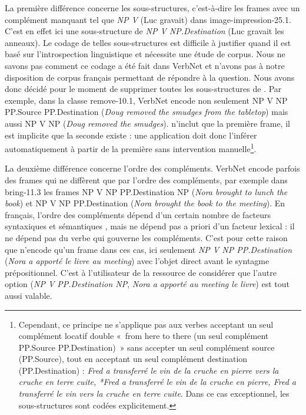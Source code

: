La première différence concerne les sous-structures, c'est-à-dire les frames
avec un complément manquant tel que \emph{NP V} (Luc gravait) dans
{\color{blue}image-impression-25.1}. C'est en effet ici une sous-structure de
\emph{NP V NP.Destination} (Luc gravait les anneaux). Le codage de telles
sous-structures est difficile à justifier quand il est basé sur l'introspection
linguistique et nécessite une étude de corpus. Nous ne savons pas comment ce
codage a été fait dans VerbNet et n'avons pas à notre disposition de corpus
français permettant de répondre à la question. Nous avons donc décidé pour le
moment de supprimer toutes les sous-structures de \verbenet{}. Par exemple,
dans la classe {\color{blue}remove-10.1}, VerbNet encode non seulement NP V NP
PP.Source PP.Destination (\emph{Doug removed the smudges from the tabletop})
mais aussi NP V NP (\emph{Doug removed the smudges}). \verbenet{} n'inclut que
la première frame, il est implicite que la seconde existe : une application
doit donc l'inférer automatiquement à partir de la première sans intervention
manuelle\footnote{Cependant, ce principe ne s'applique pas aux verbes acceptant
un seul complément locatif double «~from here to there (un seul
complément PP.Source PP.Destination)~» sans accepter un seul complément source
(PP.Source), tout en acceptant un seul complément destination
(PP.Destination) : \emph{Fred a transferré le vin de la cruche en pierre vers
la cruche en terre cuite, *Fred a transferré le vin de la cruche en pierre,
Fred a transferré le vin vers la cruche en terre cuite}. Dans ce cas
exceptionnel, les sous-structures sont codées explicitement.}.

La deuxième différence concerne l'ordre des compléments. VerbNet encode parfois
des frames qui ne diffèrent que par l'ordre des compléments, par exemple dans
{\color{blue}bring-11.3} les frames NP V NP PP.Destination NP (\emph{Nora
brought to lunch the book}) et NP V NP PP.Destination (\emph{Nora brought the
book to the meeting}). En français, l'ordre des compléments dépend d'un certain
nombre de facteurs syntaxiques et sémantiques \citep{thuilier2012contraintes},
mais ne dépend pas a priori d'un facteur lexical : il ne dépend pas du verbe
qui gouverne les compléments. C'est pour cette raison que \verbenet{} n'encode
qu'un frame dans ces cas, ici seulement \emph{NP V NP PP.Destination}
(\emph{Nora a apporté le livre au meeting}) avec l'objet direct avant le
syntagme prépositionnel. C'est à l'utilisateur de la ressource de considérer
que l'autre option (\emph{NP V PP.Destination NP}, \emph{Nora a apporté au meeting
le livre}) est tout aussi valable.

